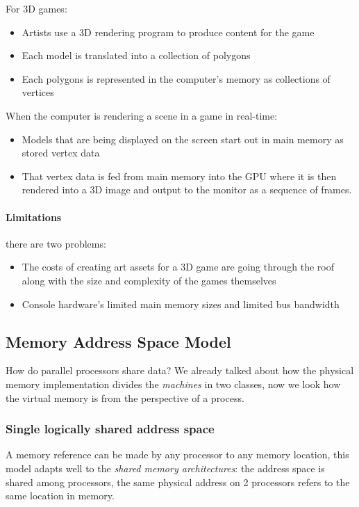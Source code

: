 For 3D games:
\begin{itemize}
    \item Artists use a 3D rendering program to produce content for the game
    \item Each model is translated into a collection of polygons
    \item Each polygons is represented in the computer's memory as collections of vertices
\end{itemize}
When the computer is rendering a scene in a game in real-time:
\begin{itemize}
    \item Models that are being displayed on the screen start out in main
memory as stored vertex data
    \item That vertex data is fed from main memory into the GPU where it is then rendered into a 3D image and output
    to the monitor as a sequence of frames.
\end{itemize}

\paragraph{Limitations} there are two problems:
\begin{itemize}
    \item The costs of creating art assets for a 3D game are
going through the roof along with the size and
complexity of the games themselves
    \item Console hardware's limited main memory sizes and
limited bus bandwidth
\end{itemize}


\subsection{Memory Address Space Model}\label{subsec:memory-address-space-model}
How do parallel processors share data?
We already talked about how the physical memory implementation divides the \textit{machines} in two classes, now we 
look how the virtual memory is from the perspective of a process.

\subsubsection{Single logically shared address space}
A memory reference can be made by any processor to any memory location, this model adapts well to the
\textit{shared memory architectures}: the address space is shared among processors, the same physical address on 2
processors refers to the same location in memory.

